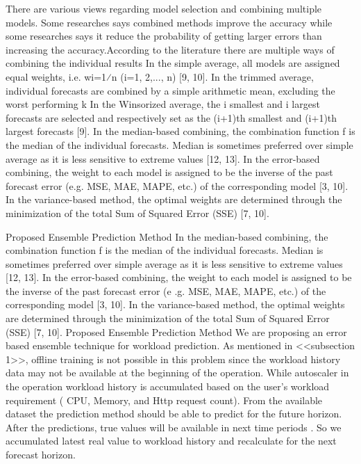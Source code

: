 There are various views regarding model selection and combining multiple models. Some researches says combined methods improve the accuracy while some researches says it reduce the probability of getting larger errors than increasing the accuracy.According to the literature there are multiple ways of combining the individual results 
In the simple average, all models are assigned equal weights, i.e. wi=1⁄n (i=1, 2,..., n) [9, 10].
In the trimmed average, individual forecasts are combined by a simple arithmetic mean, excluding the worst performing k%
In the Winsorized average, the i smallest and i largest forecasts are selected and respectively set as the (i+1)th smallest and (i+1)th largest forecasts [9].
In the median-based combining, the combination function f is the median of the individual forecasts. Median is sometimes preferred over simple average as it is less sensitive to extreme values [12, 13].
In the error-based combining, the weight to each model is assigned to be the inverse of the past forecast error (e.g. MSE, MAE, MAPE, etc.) of the corresponding model [3, 10].
In the variance-based method, the optimal weights are determined through the minimization of the total Sum of Squared Error (SSE) [7, 10].

Proposed Ensemble Prediction Method
In the median-based combining, the combination function f is the median of the individual forecasts. Median is 
sometimes preferred over simple average as it is less sensitive to extreme values [12, 13].
In the error-based combining, the weight to each model is assigned to be the inverse of the past forecast error (e
.g. MSE, MAE, MAPE, etc.) of the corresponding model [3, 10].
In the variance-based method, the optimal weights are determined through the minimization of the total Sum of 
Squared Error (SSE) [7, 10].
Proposed Ensemble Prediction Method
We are proposing an error based ensemble technique for workload prediction. As mentioned in <<subsection 1>>, 
offline training is not possible in this problem since the  workload history data may not be available at the 
beginning of the operation. While autoscaler in the operation workload history  is accumulated based on the user's 
workload requirement ( CPU, Memory, and Http request count). From the available dataset the prediction method 
should be able to predict for the future horizon. After the predictions, true values will be available in next time 
periods . So we accumulated latest real value to workload history and recalculate for the next forecast horizon. 
        
